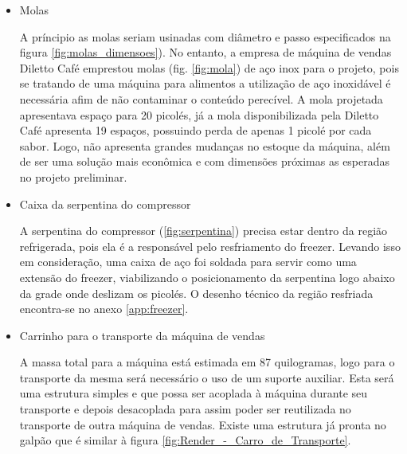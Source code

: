 \begin{itemize}
\item Molas

A príncipio as molas seriam usinadas com diâmetro e passo especificados na figura \ref{fig:molas_dimensoes}). No entanto, a empresa de máquina de vendas Diletto Café emprestou molas (fig. \ref{fig:mola}) de aço inox  para o projeto, pois se tratando de uma máquina para alimentos a utilização de aço inoxidável é necessária afim de não contaminar o conteúdo perecível. A mola projetada apresentava espaço para 20 picolés, já a mola disponibilizada pela Diletto Café apresenta 19 espaços, possuindo perda de apenas 1 picolé por cada sabor. Logo, não apresenta grandes mudanças no estoque da máquina, além de ser uma solução mais econômica e com dimensões próximas as esperadas no projeto preliminar.



\item Caixa da serpentina do compressor

A serpentina do compressor (\ref{fig:serpentina}) precisa estar dentro da região refrigerada, pois ela é a responsável pelo resfriamento do freezer. Levando isso em consideração, uma caixa de aço foi soldada para servir como uma extensão do freezer, viabilizando o posicionamento da serpentina logo abaixo da grade onde deslizam os picolés. O desenho técnico da região resfriada encontra-se no anexo \ref{app:freezer}.


\item Carrinho para o transporte da máquina de vendas

	A massa total para a máquina está estimada em 87 quilogramas, logo para o transporte da mesma será necessário o uso de um suporte auxiliar. Esta será uma estrutura simples e que possa ser acoplada à máquina durante seu transporte e depois desacoplada para assim poder ser reutilizada no transporte de outra máquina de vendas. Existe uma  estrutura já pronta no galpão que é similar à figura \ref{fig:Render_-_Carro_de_Transporte}.


\end{itemize}
